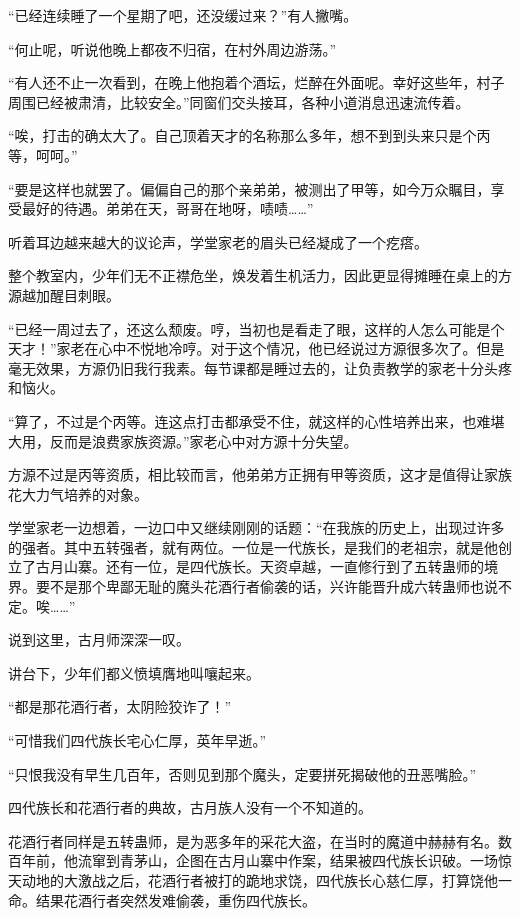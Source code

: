 \begin{this_body}
“已经连续睡了一个星期了吧，还没缓过来？”有人撇嘴。

“何止呢，听说他晚上都夜不归宿，在村外周边游荡。”

“有人还不止一次看到，在晚上他抱着个酒坛，烂醉在外面呢。幸好这些年，村子周围已经被肃清，比较安全。”同窗们交头接耳，各种小道消息迅速流传着。

“唉，打击的确太大了。自己顶着天才的名称那么多年，想不到到头来只是个丙等，呵呵。”

“要是这样也就罢了。偏偏自己的那个亲弟弟，被测出了甲等，如今万众瞩目，享受最好的待遇。弟弟在天，哥哥在地呀，啧啧……”

听着耳边越来越大的议论声，学堂家老的眉头已经凝成了一个疙瘩。

整个教室内，少年们无不正襟危坐，焕发着生机活力，因此更显得摊睡在桌上的方源越加醒目刺眼。

“已经一周过去了，还这么颓废。哼，当初也是看走了眼，这样的人怎么可能是个天才！”家老在心中不悦地冷哼。对于这个情况，他已经说过方源很多次了。但是毫无效果，方源仍旧我行我素。每节课都是睡过去的，让负责教学的家老十分头疼和恼火。

“算了，不过是个丙等。连这点打击都承受不住，就这样的心性培养出来，也难堪大用，反而是浪费家族资源。”家老心中对方源十分失望。

方源不过是丙等资质，相比较而言，他弟弟方正拥有甲等资质，这才是值得让家族花大力气培养的对象。

学堂家老一边想着，一边口中又继续刚刚的话题：“在我族的历史上，出现过许多的强者。其中五转强者，就有两位。一位是一代族长，是我们的老祖宗，就是他创立了古月山寨。还有一位，是四代族长。天资卓越，一直修行到了五转蛊师的境界。要不是那个卑鄙无耻的魔头花酒行者偷袭的话，兴许能晋升成六转蛊师也说不定。唉……”

说到这里，古月师深深一叹。

讲台下，少年们都义愤填膺地叫嚷起来。

“都是那花酒行者，太阴险狡诈了！”

“可惜我们四代族长宅心仁厚，英年早逝。”

“只恨我没有早生几百年，否则见到那个魔头，定要拼死揭破他的丑恶嘴脸。”

四代族长和花酒行者的典故，古月族人没有一个不知道的。

花酒行者同样是五转蛊师，是为恶多年的采花大盗，在当时的魔道中赫赫有名。数百年前，他流窜到青茅山，企图在古月山寨中作案，结果被四代族长识破。一场惊天动地的大激战之后，花酒行者被打的跪地求饶，四代族长心慈仁厚，打算饶他一命。结果花酒行者突然发难偷袭，重伤四代族长。


\end{this_body}
